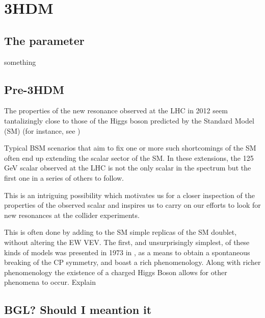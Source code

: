 
\newpage 


\chapter{3HDM}

\section{ The parameter }

something 

\section{Pre-3HDM}

The properties of the new resonance observed at the LHC in 2012 \cite{Aad_2012,chatrchyan2012observation} seem tantalizingly close to those of the Higgs boson predicted by the Standard Model (SM) (for instance, see \cite{collaborations2015combined,collaborations2016measurements} ) 

  
Typical BSM scenarios that aim to fix one or more such shortcomings of the SM often end up extending the scalar
sector of the SM. In these extensions, the 125 GeV scalar observed at the LHC is not the only scalar in the spectrum but the first one in a series of others to follow.

This is an intriguing possibility which motivates us
for a closer inspection of the properties of the observed scalar and inspires us to carry on our efforts to look for
new resonances at the collider experiments.

This is often done by adding to the SM simple replicas of the SM doublet, without altering the EW VEV. The first, and unsurprisingly simplest, of these kinds of models was presented in 1973 in \cite{lee1973theory}, as a means to obtain a spontaneous breaking of the CP symmetry, and boast a rich phenomenology. Along with richer phenomenology the existence of a charged Higgs Boson allows for other phenomena to occur. {\color{red} Explain} 

\section{BGL? Should I meantion it}

